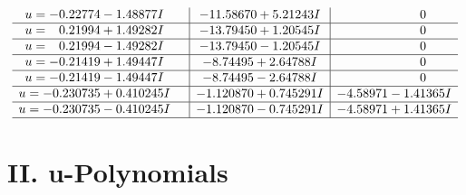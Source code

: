 \documentclass[1p]{elsarticle_modified}
\theoremstyle{definition}
\begin{document}
$$\begin{array}{c|c|c}
\begin{aligned}
u &= -0.22774 - 1.48877 I\end{aligned}
 & -11.58670 + 5.21243 I & \phantom{-0.000000 } 0 \\ \hline\begin{aligned}
u &= \phantom{-}0.21994 + 1.49282 I\end{aligned}
 & -13.79450 + 1.20545 I & \phantom{-0.000000 } 0 \\ \hline\begin{aligned}
u &= \phantom{-}0.21994 - 1.49282 I\end{aligned}
 & -13.79450 - 1.20545 I & \phantom{-0.000000 } 0 \\ \hline\begin{aligned}
u &= -0.21419 + 1.49447 I\end{aligned}
 & -8.74495 + 2.64788 I & \phantom{-0.000000 } 0 \\ \hline\begin{aligned}
u &= -0.21419 - 1.49447 I\end{aligned}
 & -8.74495 - 2.64788 I & \phantom{-0.000000 } 0 \\ \hline\begin{aligned}
u &= -0.230735 + 0.410245 I\end{aligned}
 & -1.120870 + 0.745291 I & -4.58971 - 1.41365 I \\ \hline\begin{aligned}
u &= -0.230735 - 0.410245 I\end{aligned}
 & -1.120870 - 0.745291 I & -4.58971 + 1.41365 I\\
 \hline 
 \end{array}$$\newpage
\newpage\renewcommand{\arraystretch}{1}
\centering \section*{ II. u-Polynomials}
\end{document}
